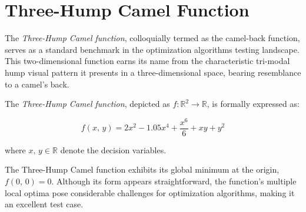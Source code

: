 \section{Three-Hump Camel Function}
\label{sec:app:test:three-hump}
  The \emph{Three-Hump Camel function}, colloquially termed as the camel-back 
  function, serves as a standard benchmark in the optimization algorithms
  testing landscape.
  This two-dimensional function earns its name from the characteristic tri-modal
  hump visual pattern it presents in a three-dimensional space, bearing
  resemblance to a camel's back.

  \begin{definition}
    \label{def:app:test:three-hump}
    The \emph{Three-Hump Camel function}, depicted as \(f: \mathbb{R}^2 \rightarrow 
    \mathbb{R}\), is formally expressed as:

    \begin{equation}
      \label{eq:app:test:three-hump}
      f(x,\, y) = 2x^2 - 1.05x^4 + \frac{x^6}{6} + xy + y^2
    \end{equation}
    
    where \(x,\, y \in \mathbb{R}\) denote the decision variables.
  \end{definition}

  The Three-Hump Camel function exhibits its global minimum at the origin,
  \(f(0,\, 0) = 0\).
  Although its form appears straightforward, the function's multiple local
  optima pose considerable challenges for optimization algorithms, making it an
  excellent test case.


